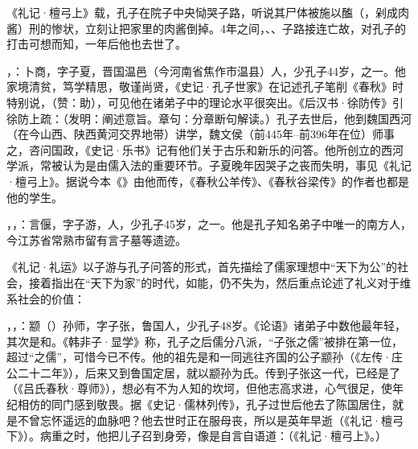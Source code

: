《礼记·檀弓上》载，孔子在院子中央恸哭子路，听说其尸体被施以醢（，剁成肉酱）刑的惨状，立刻让把家里的肉酱倒掉。4年之间，、、子路接连亡故，对孔子的打击可想而知，一年后他也去世了。

，：卜商，字子夏，晋国温邑（今河南省焦作市温县）人，少孔子44岁，之一。他家境清贫，笃学精思，敬谨尚贤，《史记·孔子世家》在记述孔子笔削《春秋》时特别说，（赞：助），可见他在诸弟子中的理论水平很突出。《后汉书·徐防传》引徐防上疏：（发明：阐述意旨。章句：分章断句解读。）孔子去世后，他到魏国西河（在今山西、陕西黄河交界地带）讲学，魏文侯（前445年--前396年在位）师事之，咨问国政，《史记·乐书》记有他们关于古乐和新乐的问答。他所创立的西河学派，常被认为是由儒入法的重要环节。子夏晚年因哭子之丧而失明，事见《礼记·檀弓上》。据说今本《》由他而传，《春秋公羊传》、《春秋谷梁传》的作者也都是他的学生。

，，：言偃，字子游，人，少孔子45岁，之一。他是孔子知名弟子中唯一的南方人，今江苏省常熟市留有言子墓等遗迹。

《礼记·礼运》以子游与孔子问答的形式，首先描绘了儒家理想中“天下为公”的社会，接着指出在“天下为家”的时代，如能，仍不失为，然后重点论述了礼义对于维系社会的价值： %

，，：颛（）孙师，字子张，鲁国人，少孔子48岁。《论语》诸弟子中数他最年轻，其次是和。《韩非子·显学》称，孔子之后儒分八派，“子张之儒”被排在第一位，超过“之儒”，可惜今已不传。他的祖先是和一同逃往齐国的公子颛孙（《左传·庄公二十二年》），后来又到鲁国定居，就以颛孙为氏。传到子张这一代，已经是了（《吕氏春秋·尊师》），想必有不为人知的坎坷，但他志高求进，心气很足，使年纪相仿的同门感到敬畏。据《史记·儒林列传》，孔子过世后他去了陈国居住，就是不曾忘怀遥远的血脉吧？他去世时正在服母丧，所以是英年早逝（《礼记·檀弓下》）。病重之时，他把儿子召到身旁，像是自言自语道：（《礼记·檀弓上》。）%


